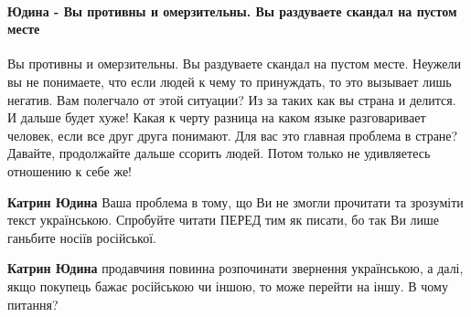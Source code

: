 
 
 
 
 
\paragraph{Юдина - Вы противны и омерзительны. Вы раздуваете скандал на пустом месте}
\label{sec:25_07_2021.fb.hvylja_oksana.1.otchet_druzja.cmt.judina_vy_protivny}

\begin{itemize}
 

Вы противны и омерзительны. Вы раздуваете скандал на пустом месте. Неужели вы
не понимаете, что если людей к чему то принуждать, то это вызывает лишь
негатив. Вам полегчало от этой ситуации? Из за таких как вы страна и делится. И
дальше будет хуже! Какая к черту разница на каком языке разговаривает человек,
если все друг друга понимают. Для вас это главная проблема в стране? Давайте,
продолжайте дальше ссорить людей. Потом только не удивляетесь отношению к себе
же!

\begin{itemize}
 
\textbf{Катрин Юдина} Ваша проблема в тому, що Ви не змогли прочитати та зрозуміти текст українською. Спробуйте читати ПЕРЕД тим як писати, бо так Ви лише ганьбите носіїв російської.

 
\textbf{Катрин Юдина} продавчиня повинна розпочинати звернення українською, а далі, якщо покупець бажає російською чи іншою, то може перейти на іншу. В чому питання?


\end{itemize}
\end{itemize}
